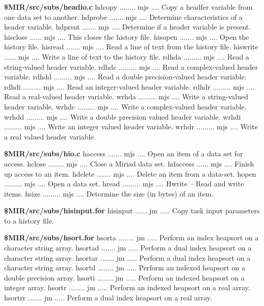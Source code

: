 \par{\bf \$MIR/src/subs/headio.c}
{\eightpoint\begintt
hdcopy ........ mjs .... Copy a headfer variable from one data set to another.
hdprobe ....... mjs .... Determine characteristics of a header variable.
hdprsnt ....... mjs .... Determine if a header variable is present.
hisclose ...... mjs .... This closes the history file.
hisopen ....... mjs .... Open the history file.
\endtt}
{\eightpoint\begintt
hisread ....... mjs .... Read a line of text from the history file.
hiswrite ...... mjs .... Write a line of text to the history file.
rdhda ......... mjs .... Read a string-valued header variable.
rdhdc ......... mjs .... Read a complex-valued header variable.
rdhdd ......... mjs .... Read a double precision-valued header variable.
\endtt}
{\eightpoint\begintt
rdhdi ......... mjs .... Read an integer-valued header variable.
rdhdr ......... mjs .... Read a real-valued header variable.
wrhda ......... mjs .... Write a string-valued header variable.
wrhdc ......... mjs .... Write a complex-valued header variable.
wrhdd ......... mjs .... Write a double precision valued header variable.
\endtt}
{\eightpoint\begintt
wrhdi ......... mjs .... Write an integer valued header variable.
wrhdr ......... mjs .... Write a real valued header variable.
\endtt}
\par{\bf \$MIR/src/subs/hio.c}
{\eightpoint\begintt
haccess ....... mjs .... Open an item of a data set for access.
hclose ........ mjs .... Close a Miriad data set.
hdaccess ...... mjs .... Finish up access to an item.
hdelete ....... mjs .... Delete an item from a data-set.
hopen ......... mjs .... Open a data set.
\endtt}
{\eightpoint\begintt
hread ......... mjs .... Hwrite -- Read and write items.
hsize ......... mjs .... Determine the size (in bytes) of an item.
\endtt}
\par{\bf \$MIR/src/subs/hisinput.for}
{\eightpoint\begintt
hisinput ...... jm ..... Copy task input parameters to a history file.
\endtt}
\par{\bf \$MIR/src/subs/hsort.for}
{\eightpoint\begintt
hsorta ........ jm ..... Perform an index heapsort on a character string array.
hsortad ....... jm ..... Perform a dual index heapsort on a character string array.
hsortar ....... jm ..... Perform a dual index heapsort on a character string array.
hsortd ........ jm ..... Perform an indexed heapsort on a double precision array.
hsorti ........ jm ..... Perform an indexed heapsort on a integer array.
\endtt}
{\eightpoint\begintt
hsortr ........ jm ..... Perform an indexed heapsort on a real array.
hsortrr ....... jm ..... Perform a dual index heapsort on a real array.
\endtt}

